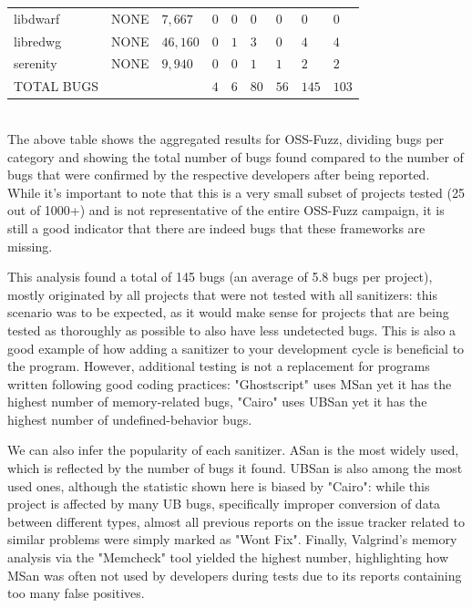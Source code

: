 \begin{adjustbox}{width=\textwidth,center}
\begin{tabular}{|l|l|l|l|l|l|l|l|l|}
libdwarf         & NONE                & $7,667$             & $0$              & $0$           & $0$           & $0$            & $0$             & $0$                 \\
libredwg         & NONE                & $46,160$            & $0$              & $1$           & $3$           & $0$            & $4$             & $4$                 \\
serenity         & NONE                & $9,940$             & $0$              & $0$           & $1$           & $1$            & $2$             & $2$                 \\
\hline
TOTAL BUGS   &   &   &$4$   &$6$   &$80$   &$56$   &$145$   &$103$       \\
\hline
\end{tabular}
\end{adjustbox}{}
\ \\ 

The above table shows the aggregated results for OSS-Fuzz, dividing bugs per category and showing the total number of bugs found compared to the number of bugs that were confirmed by the respective developers after being reported. While it's important to note that this is a very small subset of projects tested (25 out of 1000+) and is not representative of the entire OSS-Fuzz campaign, it is still a good indicator that there are indeed bugs that these frameworks are missing.

This analysis found a total of 145 bugs (an average of 5.8 bugs per project), mostly originated by all projects that were not tested with all sanitizers: this scenario was to be expected, as it would make sense for projects that are being tested as thoroughly as possible to also have less undetected bugs. This is also a good example of how adding a sanitizer to your development cycle is beneficial to the program. However, additional testing is not a replacement for programs written following good coding practices: "Ghostscript" uses MSan yet it has the highest number of memory-related bugs, "Cairo" uses UBSan yet it has the highest number of undefined-behavior bugs. 

We can also infer the popularity of each sanitizer. ASan is the most widely used, which is reflected by the number of bugs it found. UBSan is also among the most used ones, although the statistic shown here is biased by "Cairo": while this project is affected by many UB bugs, specifically improper conversion of data between different types, almost all previous reports on the issue tracker related to similar problems were simply marked as "Wont Fix". Finally, Valgrind's memory analysis via the "Memcheck" tool yielded the highest number, highlighting how MSan was often not used by developers during tests due to its reports containing too many false positives.



